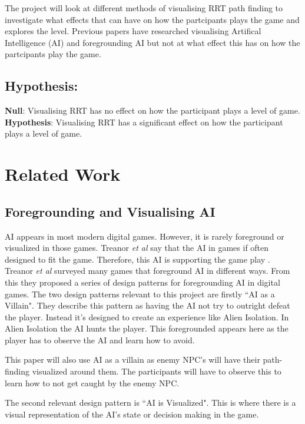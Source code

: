 \documentclass[journal]{IEEEtran}
\begin{document}
The project will look at different methods of visualising RRT path finding to investigate what effects that can have on how the partcipants plays the game and explores the level.  Previous papers have researched visualising Artifical Intelligence (AI) and foregrounding AI but not at what effect this has on how the partcipants play the game.


\subsection{Hypothesis:}
\textbf{Null}: Visualising RRT has no effect on how the participant plays a level of game. \\
\textbf{Hypothesis}: Visualising RRT has a significant effect on how the participant plays a level of game. 


\section{Related Work}
\subsection{Foregrounding and Visualising AI}
AI appears in most modern digital games. However, it is rarely foreground or visualized in those games.  Treanor  \textit{et al} say that the AI in games if often designed to fit the game. Therefore, this AI is supporting the game play   \cite{treanor2015, eladhari2011}.  \\


Treanor  \textit{et al}  surveyed many games that foreground AI in different ways.  From this they proposed a series of design patterns for foregrounding AI in digital games. 
The two design patterns relevant to this project are firstly ``AI as a Villain".  They describe this pattern as having the AI not try to outright defeat the player. Instead it's designed to create an experience like Alien Isolation.  In Alien Isolation the AI hunts the player. This foregrounded appears here as the player has to observe the AI and learn how to avoid. 

This paper will also use AI as a villain as enemy NPC's  will have their path-finding visualized around them. The participants will have to observe this to learn how to not get caught by the enemy NPC.  


The second relevant design pattern is ``AI is Visualized". This is where there is a visual representation of the AI's state or decision making in the game. 
\end{document}
